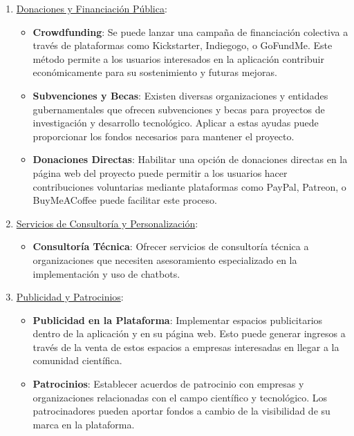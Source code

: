 \begin{enumerate}
    \item \underline{Donaciones y Financiación Pública}:
    \begin{itemize}
        \item \textbf{Crowdfunding}: Se puede lanzar una campaña de financiación colectiva a través de plataformas como Kickstarter, Indiegogo, o GoFundMe. Este método permite a los usuarios interesados en la aplicación contribuir económicamente para su sostenimiento y futuras mejoras.
        \item \textbf{Subvenciones y Becas}: Existen diversas organizaciones y entidades gubernamentales que ofrecen subvenciones y becas para proyectos de investigación y desarrollo tecnológico. Aplicar a estas ayudas puede proporcionar los fondos necesarios para mantener el proyecto.
        \item \textbf{Donaciones Directas}: Habilitar una opción de donaciones directas en la página web del proyecto puede permitir a los usuarios hacer contribuciones voluntarias mediante plataformas como PayPal, Patreon, o BuyMeACoffee puede facilitar este proceso.
    \end{itemize}

    \item \underline{Servicios de Consultoría y Personalización}:
    \begin{itemize}
        \item \textbf{Consultoría Técnica}: Ofrecer servicios de consultoría técnica a organizaciones que necesiten asesoramiento especializado en la implementación y uso de chatbots. 
    \end{itemize}

    \item \underline{Publicidad y Patrocinios}:
    \begin{itemize}
        \item \textbf{Publicidad en la Plataforma}: Implementar espacios publicitarios dentro de la aplicación y en su página web. Esto puede generar ingresos a través de la venta de estos espacios a empresas interesadas en llegar a la comunidad científica.
        \item \textbf{Patrocinios}: Establecer acuerdos de patrocinio con empresas y organizaciones relacionadas con el campo científico y tecnológico. Los patrocinadores pueden aportar fondos a cambio de la visibilidad de su marca en la plataforma.
    \end{itemize}


\end{enumerate}

